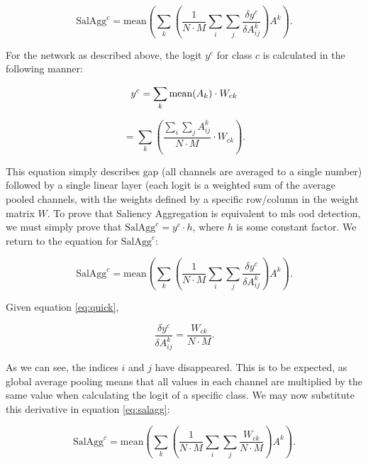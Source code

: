 \documentclass[UKenglish]{uiomasterthesis} %
\theoremstyle{definition}
\begin{document}
\begin{equation}
    \text{SalAgg}^c = \text{mean} \left(\sum_k \left( \frac{1}{N \cdot M} \sum_i \sum_j \frac{\delta y^c}{\delta A_{ij}^k} \right) A^k \right).
\end{equation}

For the network as described above, the logit $y^c$ for class $c$ is calculated in the following manner:

\begin{equation}
    y^c = \sum_k \text{mean}(A_k) \cdot W_{ck} \\
\end{equation}

\begin{equation} \label{eq:quick}
    = \sum_k \left( \frac{\sum_i \sum_j A^k_{ij}}{N \cdot M} \cdot W_{ck} \right) .
\end{equation}

This equation simply describes \ac{gap} (all channels are averaged to a single number) followed by a single linear layer (each logit is a weighted sum of the average pooled channels, with the weights defined by a specific row/column in the weight matrix $W$. To prove that Saliency Aggregation is equivalent to \ac{mls} \ac{ood} detection, we must simply prove that $\text{SalAgg}^c = y^c \cdot h$, where $h$ is some constant factor. We return to the equation for $\text{SalAgg}^c$:

\begin{equation} \label{eq:salagg}
    \text{SalAgg}^c = \text{mean} \left(\sum_k \left( \frac{1}{N \cdot M} \sum_i \sum_j \frac{\delta y^c}{\delta A_{ij}^k} \right) A^k \right).
\end{equation}

Given equation \ref{eq:quick},

\begin{equation}
    \frac{\delta y^c}{\delta A^k_{ij}} = \frac{W_{ck}}{N \cdot M}.
\end{equation}

As we can see, the indices $i$ and $j$ have disappeared. This is to be expected, as global average pooling means that all values in each channel are multiplied by the same value when calculating the logit of a specific class. We may now substitute this derivative in equation \ref{eq:salagg}:

\begin{equation}
    \text{SalAgg}^c = \text{mean} \left(\sum_k \left( \frac{1}{N \cdot M} \sum_i \sum_j \frac{W_{ck}}{N \cdot M} \right) A^k \right).
\end{equation}
\end{document}
